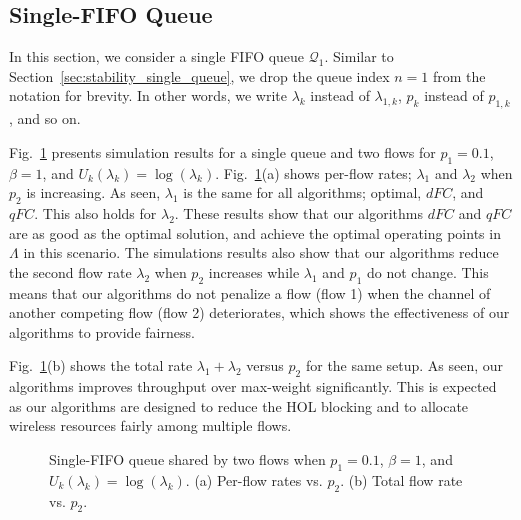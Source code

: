 \documentclass[conference]{IEEEtran}
\newcommand{\Qset}{\mathcal{Q}}
\begin{document}
\subsection{Single-FIFO Queue}
In this section, we consider  a single FIFO queue $\Qset_{1}$. Similar to Section~{\ref{sec:stability_single_queue}}, we drop the queue index $n=1$ from the notation for brevity. In other words, we write $\lambda_{k}$ instead of $\lambda_{1,k}$, $p_{k}$ instead of $p_{1,k}$, and so on. 

Fig.~\ref{fig:sim_1} presents simulation results for a single queue and two flows for $p_1=0.1$, $\beta=1$, and $U_k(\lambda_k) = \log(\lambda_k)$. Fig.~\ref{fig:sim_1}(a) shows per-flow rates; $\lambda_1$ and $\lambda_2$ when $p_2$ is increasing. As seen, $\lambda_1$ is the same for all algorithms; optimal, $dFC$, and $qFC$. This also holds for $\lambda_2$. These results show that our algorithms $dFC$ and $qFC$ are as good as the optimal solution, and achieve the optimal operating points in $\Lambda$ in this scenario. The simulations results also show that our algorithms reduce the second flow rate $\lambda_2$ when $p_2$ increases while $\lambda_1$ and $p_1$ do not change. This means that our algorithms do not penalize a flow (flow 1) when the channel of another competing flow (flow 2) deteriorates, which shows the effectiveness of our algorithms to provide fairness. 

Fig.~\ref{fig:sim_1}(b) shows the total rate $\lambda_1+\lambda_2$ versus $p_2$ for the same setup. As seen, our algorithms improves throughput over max-weight significantly. This is expected as our algorithms are designed to reduce the HOL blocking and to allocate wireless resources fairly among multiple flows. 
\begin{figure}
\centering
{} \hspace{-20pt}
\vspace{-10pt}
\caption{Single-FIFO queue shared by two flows when $p_1 = 0.1$, $\beta=1$, and $U_k(\lambda_k) = \log(\lambda_k)$. (a) Per-flow rates vs. $p_2$. (b) Total flow rate vs. $p_2$. }
\label{fig:sim_1}
\vspace{-5pt}
\end{figure}
\end{document}
